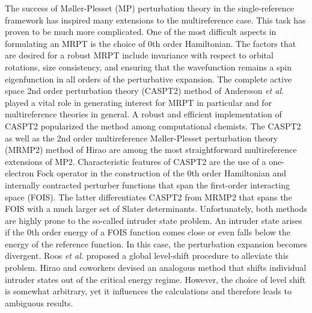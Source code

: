 The success of Møller-Plesset (MP) perturbation theory\cite{Creme_2011_509} in the single-reference framework has inspired many extensions to the multireference case. This task has proven to be much more complicated. One of the most difficult aspects in formulating an MRPT is the choice of 0th order Hamiltonian.\cite{KozloD_1994_3672} The factors that are desired for a robust MRPT include invariance with respect to orbital rotations, size consistency, and ensuring that the wavefunction remains a spin eigenfunction in all orders of the perturbative expansion.  The complete active space 2nd order perturbation theory (CASPT2) method of Andersson \textit{et al.}\cite{AnderMRSW_1990_5483, AnderMR_1992_1218} played a vital role in generating interest for MRPT in particular and for multireference theories in general. A robust and efficient implementation of CASPT2 popularized the method among computational chemists. The CASPT2 as well as the 2nd order multireference Møller-Plesset perturbation theory (MRMP2) method of Hirao\cite{Hirao_1992_374, Hirao_1992_397} are among the most straightforward multireference extensions of MP2. Characteristic features of CASPT2 are the use of a one-electron Fock operator in the construction of the 0th order Hamiltonian and internally contracted perturber functions that span the first-order interacting space (FOIS)\cite{McLeaL_1973_1066}. The latter differentiates CASPT2 from MRMP2 that spans the FOIS with a much larger set of Slater determinants. Unfortunately, both methods are highly prone to the so-called intruder state problem.\cite{CamacWY_2009_468} An intruder state arises if the 0th order energy of a FOIS function comes close or even falls below the energy of the reference function. In this case, the perturbation expansion becomes divergent. Roos \textit{et al.} proposed a global level-shift procedure to alleviate this problem.\cite{RoosA_1995_215, RoosAFSPMM_1996_257} Hirao and coworkers devised an analogous method that shifts individual intruder states out of the critical energy regime.\cite{ChoeWFH_2001_3913, WitekCFH_2002_957} However, the choice of level shift is somewhat arbitrary, yet it influences the calculations and therefore leads to ambiguous results.\cite{ZobelNG_2017_1482} 

